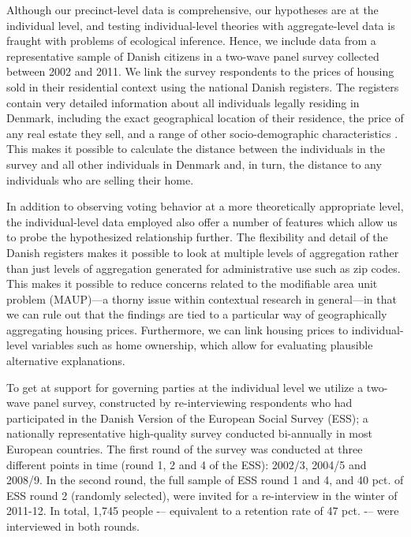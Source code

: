 \documentclass[12pt,a4paper]{article}
\begin{document}
	Although our precinct-level data is comprehensive, our hypotheses are at the individual level, and testing individual-level theories with aggregate-level data is fraught with problems of ecological inference. Hence, we include data from a representative sample of Danish citizens in a two-wave panel survey collected between 2002 and 2011. We link the survey respondents to the prices of housing sold in their residential context using the national Danish registers. The registers contain very detailed information about all individuals legally residing in Denmark, including the exact geographical location of their residence, the price of any real estate they sell, and a range of other socio-demographic characteristics \citep{thygesen2011introduction}. This makes it possible to calculate the distance between the individuals in the survey and all other individuals in Denmark and, in turn, the distance to any individuals who are selling their home.
	
	In addition to observing voting behavior at a more theoretically appropriate level, the individual-level data employed also offer a number of features which allow us to probe the hypothesized relationship further. The flexibility and detail of the Danish registers makes it possible to look at multiple levels of aggregation rather than just levels of aggregation generated for administrative use such as zip codes. This makes it possible to reduce concerns related to the modifiable area unit problem (MAUP)—a thorny issue within contextual research in general—in that we can rule out that the findings are tied to a particular way of geographically aggregating housing prices. Furthermore, we can link housing prices to individual-level variables such as home ownership, which allow for evaluating plausible alternative explanations. 
	
	To get at support for governing parties at the individual level we utilize a two-wave panel survey, constructed by re-interviewing respondents who had participated in the Danish Version of the European Social Survey (ESS); a nationally representative high-quality survey conducted bi-annually in most European countries. The first round of the survey was conducted at three different points in time (round 1, 2 and 4 of the ESS): 2002/3, 2004/5 and 2008/9. In the second round, the full sample of ESS round 1 and 4, and 40 pct. of ESS round 2 (randomly selected), were invited for a re-interview in the winter of 2011-12. In total, 1,745 people -– equivalent to a retention rate of 47 pct. -– were interviewed in both rounds.
	
\end{document}

